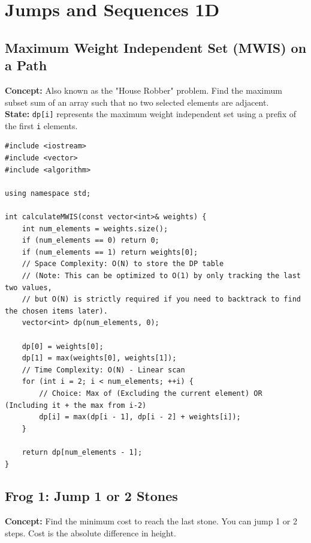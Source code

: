 \section{Jumps and Sequences 1D}

\subsection{Maximum Weight Independent Set (MWIS) on a Path}
\textbf{Concept:} Also known as the "House Robber" problem.
Find the maximum subset sum of an array such that no two selected elements are adjacent.
\\
\textbf{State:} \texttt{dp[i]} represents the maximum weight independent set using a prefix of the first \texttt{i} elements.

\begin{lstlisting}
#include <iostream>
#include <vector>
#include <algorithm>

using namespace std;

int calculateMWIS(const vector<int>& weights) {
    int num_elements = weights.size();
    if (num_elements == 0) return 0;
    if (num_elements == 1) return weights[0];
    // Space Complexity: O(N) to store the DP table
    // (Note: This can be optimized to O(1) by only tracking the last two values, 
    // but O(N) is strictly required if you need to backtrack to find the chosen items later).
    vector<int> dp(num_elements, 0);
    
    dp[0] = weights[0];
    dp[1] = max(weights[0], weights[1]);
    // Time Complexity: O(N) - Linear scan
    for (int i = 2; i < num_elements; ++i) {
        // Choice: Max of (Excluding the current element) OR (Including it + the max from i-2)
        dp[i] = max(dp[i - 1], dp[i - 2] + weights[i]);
    }
    
    return dp[num_elements - 1];
}
\end{lstlisting}

\subsection{Frog 1: Jump 1 or 2 Stones}
\textbf{Concept:} Find the minimum cost to reach the last stone.
You can jump 1 or 2 steps. Cost is the absolute difference in height.


